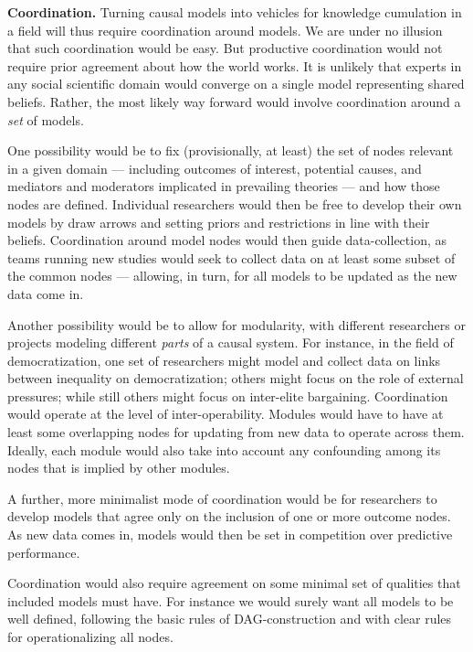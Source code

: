 \documentclass[
  12pt,
]{book}
\begin{document}
\textbf{Coordination.} Turning causal models into vehicles for knowledge cumulation in a field will thus require coordination around models. We are under no illusion that such coordination would be easy. But productive coordination would not require prior agreement about how the world works. It is unlikely that experts in any social scientific domain would converge on a single model representing shared beliefs. Rather, the most likely way forward would involve coordination around a \emph{set} of models.

One possibility would be to fix (provisionally, at least) the set of nodes relevant in a given domain --- including outcomes of interest, potential causes, and mediators and moderators implicated in prevailing theories --- and how those nodes are defined. Individual researchers would then be free to develop their own models by draw arrows and setting priors and restrictions in line with their beliefs. Coordination around model nodes would then guide data-collection, as teams running new studies would seek to collect data on at least some subset of the common nodes --- allowing, in turn, for all models to be updated as the new data come in.

Another possibility would be to allow for modularity, with different researchers or projects modeling different \emph{parts} of a causal system. For instance, in the field of democratization, one set of researchers might model and collect data on links between inequality on democratization; others might focus on the role of external pressures; while still others might focus on inter-elite bargaining. Coordination would operate at the level of inter-operability. Modules would have to have at least some overlapping nodes for updating from new data to operate across them. Ideally, each module would also take into account any confounding among its nodes that is implied by other modules.

A further, more minimalist mode of coordination would be for researchers to develop models that agree only on the inclusion of one or more outcome nodes. As new data comes in, models would then be set in competition over predictive performance.

Coordination would also require agreement on some minimal set of qualities that included models must have. For instance we would surely want all models to be well defined, following the basic rules of DAG-construction and with clear rules for operationalizing all nodes.
\end{document}

